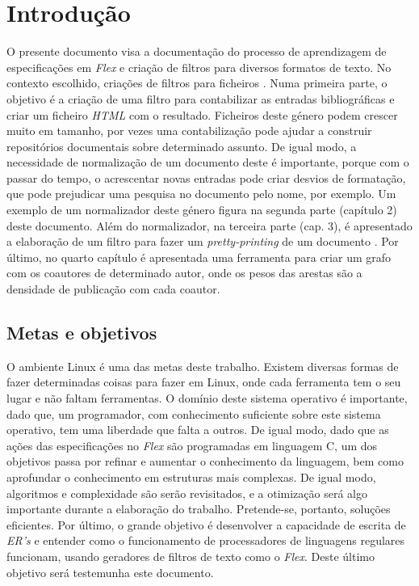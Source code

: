 \chapter*{Introdução}
\label{intro}


O presente documento visa a documentação do processo de aprendizagem de
especificações em \emph{Flex} e criação de filtros para diversos formatos de
texto. No contexto escolhido, criações de filtros para ficheiros
. Numa primeira parte, o objetivo é a criação de uma filtro para
contabilizar as entradas bibliográficas e criar um ficheiro \emph{HTML} com
o resultado. Ficheiros deste género podem crescer muito em tamanho, por vezes
uma contabilização pode ajudar a construir repositórios documentais sobre
determinado assunto. De igual modo, a necessidade de normalização de um
documento deste é importante, porque com o passar do tempo, o acrescentar novas
entradas pode criar desvios de formatação, que pode prejudicar uma pesquisa no
documento pelo nome, por exemplo. Um exemplo de um normalizador deste género
figura na segunda parte (capítulo 2) deste documento.  Além do normalizador, na
terceira parte (cap. 3), é apresentado a elaboração de um filtro para fazer um
\emph{pretty-printing} de um documento .  Por último, no quarto
capítulo é apresentada uma ferramenta para criar um grafo com os coautores de
determinado autor, onde os pesos das arestas são a densidade de publicação com
cada coautor.


\section*{Metas e objetivos} 

O ambiente Linux é uma das metas deste trabalho. Existem diversas formas de
fazer determinadas coisas para fazer em Linux, onde cada ferramenta tem o seu
lugar e não faltam ferramentas.  O domínio deste sistema operativo é importante,
dado que, um programador, com conhecimento suficiente sobre este sistema
operativo, tem uma liberdade que falta a outros. De igual modo, dado que as
ações das especificações no \emph{Flex} são programadas em linguagem C, um dos
objetivos passa por refinar e aumentar o conhecimento da linguagem, bem como
aprofundar o conhecimento em estruturas mais complexas. De igual modo,
algoritmos e complexidade são serão revisitados, e a otimização será algo
importante durante a elaboração do trabalho. Pretende-se, portanto, soluções
eficientes. Por último, o grande objetivo é desenvolver a capacidade de escrita
de \emph{ER's} e entender como o funcionamento de processadores de linguagens
regulares funcionam, usando geradores de filtros de texto como o \emph{Flex}.
Deste último objetivo será testemunha este documento.  


